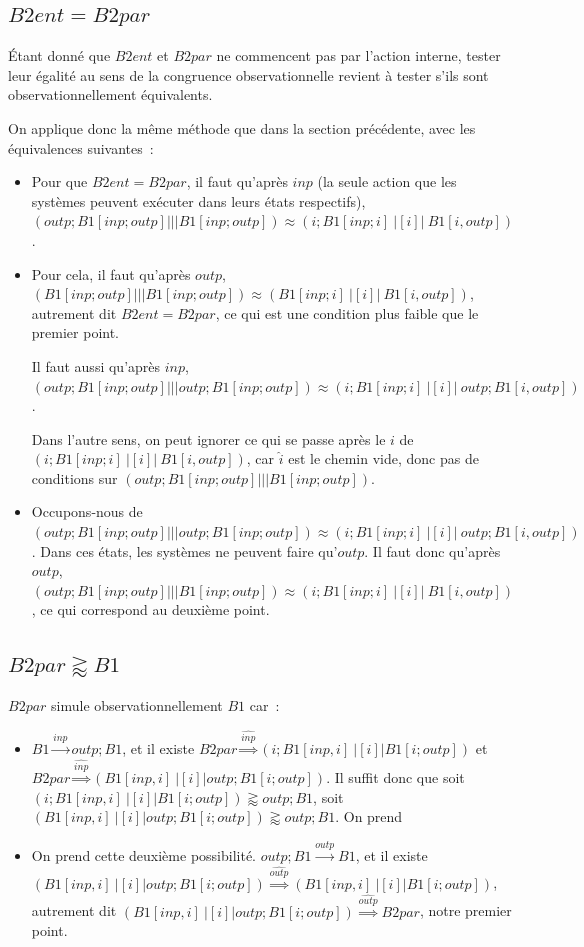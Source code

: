 \documentclass[a4paper,french,12pt]{article}
\def\transition#1{\stackrel{#1}{\longrightarrow}}
\def\Transition#1{\stackrel{#1}{\Longrightarrow}}
\def\observationnelle{\approx}
\let\simuleobs\gtrapprox
\begin{document}
\subsection{$B2ent = B2par$}

Étant donné que $B2ent$ et $B2par$ ne commencent pas par l'action
interne, tester leur égalité au sens de la congruence observationnelle
revient à tester s'ils sont observationnellement équivalents.

On applique donc la même méthode que dans la section précédente, avec
les équivalences suivantes~:

{\raggedright
  \begin{itemize}
  \item Pour que $B2ent = B2par$, il faut qu'après $inp$ (la seule
    action que les systèmes peuvent exécuter dans leurs états respectifs),
    $(outp;B1[inp;outp] ||| B1[inp;outp]) \observationnelle (i;B1[inp;i]\ |[i]|\ B1[i,outp])$.
  \item Pour cela, il faut qu'après $outp$,
    $(B1[inp;outp] ||| B1[inp;outp]) \observationnelle (B1[inp;i]\ |[i]|\ B1[i,outp])$,
    autrement dit $B2ent = B2par$, ce qui est une condition plus faible que le premier point.

    Il faut aussi qu'après $inp$,
    $(outp;B1[inp;outp] ||| outp;B1[inp;outp]) \observationnelle (i;B1[inp;i]\ |[i]|\ outp;B1[i,outp])$.
    
    Dans l'autre sens, on peut ignorer ce qui se passe après le $i$ de
    $(i;B1[inp;i]\ |[i]|\ B1[i,outp])$, car $\hat{i}$ est le chemin vide,
    donc pas de conditions sur $(outp;B1[inp;outp] ||| B1[inp;outp])$.
  \item Occupons-nous de
    $(outp;B1[inp;outp] ||| outp;B1[inp;outp]) \observationnelle (i;B1[inp;i]\ |[i]|\ outp;B1[i,outp])$.
    Dans ces états, les systèmes ne peuvent faire qu'$outp$. Il faut donc qu'après $outp$,
    $(outp;B1[inp;outp] ||| B1[inp;outp]) \observationnelle (i;B1[inp;i]\ |[i]|\ B1[i,outp])$,
    ce qui correspond au deuxième point.
  \end{itemize}
}

\subsection{$B2par \simuleobs B1$}

$B2par$ simule observationnellement $B1$ car~:

\begin{itemize}
\item $B1\transition{inp}outp;B1$, et il existe
  $B2par\Transition{\hat{inp}}(i;B1[inp,i]\ |[i]| B1[i;outp])$ et
  $B2par\Transition{\hat{inp}}(B1[inp,i]\ |[i]| outp;B1[i;outp])$.
  Il suffit donc que soit $(i;B1[inp,i]\ |[i]| B1[i;outp]) \simuleobs outp;B1$,
  soit $(B1[inp,i]\ |[i]| outp;B1[i;outp]) \simuleobs outp;B1$. On prend
\item On prend cette deuxième possibilité.
  $outp;B1 \transition{outp} B1$, et il existe
  $(B1[inp,i]\ |[i]| outp;B1[i;outp])\Transition{\hat{outp}}(B1[inp,i]\ |[i]| B1[i;outp])$,
  autrement dit
  $(B1[inp,i]\ |[i]| outp;B1[i;outp])\Transition{\hat{outp}}B2par$, notre premier point.
\end{itemize}
\end{document}
